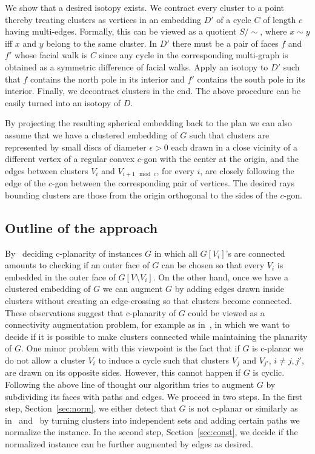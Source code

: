 \documentclass{llncs}
\begin{document}
We show that a desired isotopy exists. We contract every cluster to a point thereby
treating clusters as vertices in an embedding $D'$ of a cycle $C$ of length $c$ having multi-edges. 
Formally, this can be viewed as a quotient $S/\sim$, where $x\sim y$ iff
$x$ and $y$ belong to the same cluster.
In $D'$ there must be a pair of faces $f$ and $f'$ whose facial walk is $C$ since any cycle in the corresponding multi-graph is obtained as a symmetric difference of facial walks. Apply an isotopy to $D'$ such that $f$ contains
the north pole in its interior and $f'$ contains the south pole in its interior. Finally, we decontract clusters in the end. The above procedure can be easily turned into an isotopy of $D$. 

By projecting the resulting spherical embedding back to the plan we can also assume that we have a clustered embedding of $G$
such that clusters are represented by small discs of diameter $\epsilon>0$ each drawn in a close vicinity
of a different vertex of a regular convex $c$-gon with the center at the origin, and the edges
between clusters $V_i$ and $V_{i+1 \mod c}$, for every $i$, are closely following the edge
of the $c$-gon between the corresponding pair of vertices. 
The desired rays bounding clusters are those from the origin orthogonal to the sides of the $c$-gon. \\
\fi




\subsection{Outline of the approach}
\label{sec:out}
By~\cite[Theorem 1]{FCEb95} deciding c-planarity of instances $G$ in which all $G[V_i]$'s are connected amounts to 
checking if an outer face of $G$ can be chosen so that every $V_i$ is embedded in the outer face 
of $G[V\setminus V_i]$. On the other hand, once we have a clustered embedding of $G$ we can augment $G$ by adding edges drawn inside clusters without creating an edge-crossing so that clusters become connected.
These observations suggest that c-planarity of $G$ could be viewed as a connectivity augmentation problem, for example as in~\cite{CBFK14+,FKMP15},
in which we want to decide if it is possible to make clusters connected  while maintaining the planarity of $G$.
One minor problem with this viewpoint is the fact that if $G$ is c-planar we do not allow
a cluster $V_i$ to induce a cycle such that clusters $V_j$ and $V_{j'}$, $i\not=j,j'$, are drawn on its opposite 
sides. However, this cannot happen  if $G$ is cyclic.
Following the above line of thought our algorithm tries to augment $G$ by subdividing its faces with
paths and edges. We proceed in two steps. In the first step, Section~\ref{sec:norm}, we either 
detect that $G$ is not c-planar or similarly as in~\cite{ADDF13} and~\cite{F14+} by 
turning clusters into independent sets and adding certain paths we normalize the instance. In the second step, Section~\ref{sec:const}, we decide if the normalized instance can be further augmented by  edges as desired.
\end{document}
